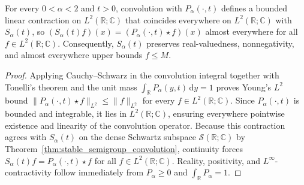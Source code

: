 \begin{theorem}\label{thm:stable_semigroup_L2_markov}
\leanok
For every $0 < \alpha < 2$ and $t > 0$, convolution with $P_\alpha(\cdot, t)$ defines a bounded linear contraction on $L^2(\mathbb{R}; \mathbb{C})$ that coincides everywhere on $L^2(\mathbb{R}; \mathbb{C})$ with $S_\alpha(t)$, so $(S_\alpha(t) f)(x) = (P_\alpha(\cdot, t) \star f)(x)$ almost everywhere for all $f \in L^2(\mathbb{R}; \mathbb{C})$. Consequently, $S_\alpha(t)$ preserves real-valuedness, nonnegativity, and almost everywhere upper bounds $f \le M$.
\end{theorem}

\begin{proof}
\leanok
Applying Cauchy--Schwarz in the convolution integral together with Tonelli's theorem and the unit mass $\int_{\mathbb{R}} P_\alpha(y, t)\, \mathrm{d}y = 1$ proves Young's $L^2$ bound $\lVert P_\alpha(\cdot, t) \star f \rVert_{L^2} \le \lVert f \rVert_{L^2}$ for every $f \in L^2(\mathbb{R}; \mathbb{C})$. Since $P_\alpha(\cdot, t)$ is bounded and integrable, it lies in $L^2(\mathbb{R}; \mathbb{C})$, ensuring everywhere pointwise existence and linearity of the convolution operator. Because this contraction agrees with $S_\alpha(t)$ on the dense Schwartz subspace $\mathcal{S}(\mathbb{R}; \mathbb{C})$ by Theorem~\ref{thm:stable_semigroup_convolution}, continuity forces $S_\alpha(t) f = P_\alpha(\cdot, t) \star f$ for all $f \in L^2(\mathbb{R}; \mathbb{C})$. Reality, positivity, and $L^\infty$-contractivity follow immediately from $P_\alpha \ge 0$ and $\int_{\mathbb{R}} P_\alpha = 1$.
\end{proof}
